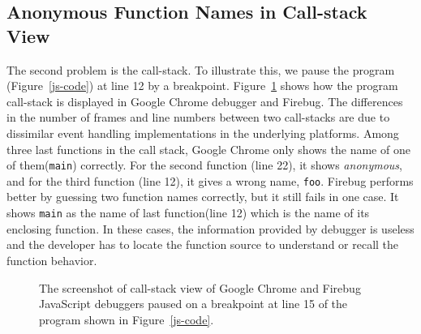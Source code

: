 \documentclass[10pt, preprint]{sigplanconf}
\begin{document}
\subsection{Anonymous Function Names in Call-stack View}
The second problem is the call-stack.
To illustrate this, we pause the program (Figure~\ref{js-code}) at line 12 by a breakpoint. Figure~\ref{debuggers-callstack} shows how the program call-stack is displayed in Google Chrome debugger and Firebug. The differences in the number of frames and line numbers between two call-stacks are due to dissimilar event handling implementations in the underlying platforms. Among three last functions in the call stack, Google Chrome only shows the name of one of them({\small\texttt{main}}) correctly. For the second function (line 22), it shows \textit{anonymous}, and for the third function (line 12), it gives a wrong name, {\small\texttt{foo}}. Firebug performs better by guessing two function names correctly, but it still fails in one case. It shows {\small\texttt{main}} as the name of last function(line 12) which is the name of its enclosing function.
In these cases, the information provided by debugger is useless and the developer has to locate the function source to understand or recall the function behavior. 


\begin{figure}[htp]
\centerline{
\hfil
{}}
\caption{The screenshot of call-stack view of Google Chrome and Firebug JavaScript debuggers paused on a breakpoint at line 15 of the program shown in Figure~\ref{js-code}.}
\label{debuggers-callstack}
\end{figure}
 
\end{document}
